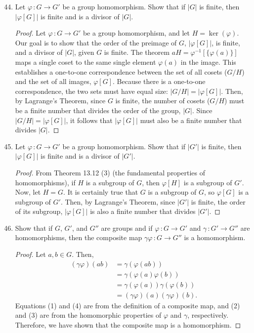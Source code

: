 \documentclass[12pt, oneside]{book}
\newcommand{\pf}[1]{
    \begin{customframedproof}[linecolor=orangehdx!75]
        \begin{proof}
        #1
        \end{proof}
    \end{customframedproof}
}
\newcommand{\funccolon}{\, \colon}
\begin{document}
\begin{enumerate}

    \setcounter{enumi}{43}
    \item Let \(\varphi \funccolon G \to G'\) be a group homomorphism. Show that if \(|G|\) is finite, then \(|\varphi[G]|\) is finite and is a divisor of \(|G|\).
    \pf{
        Let \(\varphi \funccolon G \to G'\) be a group homomorphism, and let \(H = \ker(\varphi)\). Our goal is to show that the order of the preimage of \(G\), \(|\varphi[G]|\), is finite, and a divisor of \(|G|\), given \(G\) is finite. The theorem \(aH = \varphi^{-1}[\{\varphi(a)\}]\) maps a single coset to the same single element \(\varphi(a)\) in the image. This establishes a one-to-one correspondence between the set of all cosets (\(G/H\)) and the set of all images, \(\varphi[G]\). Because there is a one-to-one correspondence, the two sets must have equal size: \(|G/H| = |\varphi[G]|\). Then, by Lagrange's Theorem, since \(G\) is finite, the number of cosets (\(G/H\)) must be a finite number that divides the order of the group, \(|G|\).  Since \(|G/H| = |\varphi[G]|\), it follows that \(|\varphi[G]|\) must also be a finite number that divides \(|G|\).
    }    

\newpage

    \item Let \(\varphi \funccolon G \to G'\) be a group homomorphism. Show that if \(|G'|\) is finite, then \(|\varphi[G]|\) is finite and is a divisor of \(|G'|\).
    \pf{
        From Theorem 13.12 (3) (the fundamental properties of homomorphisms), if \(H\) is a subgroup of \(G\), then \(\varphi[H]\) is a subgroup of \(G'\). Now, let \(H = G\). It is certainly true that \(G\) is a subgroup of \(G\), so \(\varphi[G]\) is a subgroup of \(G'\). Then, by Lagrange's Theorem, since \(|G'|\) is finite, the order of its subgroup, \(|\varphi[G]|\) is also a finite number that divides \(|G'|\). 
    }

    \setcounter{enumi}{48}
    \item Show that if \(G\), \(G'\), and \(G''\) are groups and if \(\varphi \funccolon G \to G'\) and \(\gamma \funccolon G' \to G''\) are homomorphisms, then the composite map \(\gamma \varphi \funccolon G \to G''\) is a homomorphism.
    \pf{
        Let \(a, b \in G\). Then,
        \begin{align}
            (\gamma \varphi)(ab) &= \gamma(\varphi(ab)) \\
            &= \gamma(\varphi(a)\varphi(b)) \\
            &= \gamma(\varphi(a))\gamma(\varphi(b)) \\
            &= (\gamma \varphi)(a)(\gamma \varphi)(b).
        \end{align}
        Equations (1) and (4) are from the definition of a composite map, and (2) and (3) are from the homomorphic properties of \(\varphi\) and \(\gamma\), respectively. Therefore, we have shown that the composite map is a homomorphism.
    }
\end{enumerate}
\end{document}
